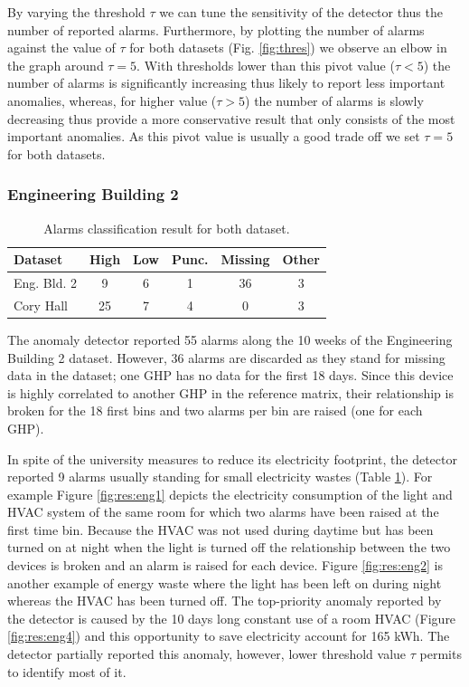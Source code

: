 By varying the threshold $\tau$ we can tune the sensitivity of the detector thus the number of reported alarms.  
Furthermore, by plotting the number of alarms against the value of $\tau$ for both datasets (Fig. \ref{fig:thres}) we observe an elbow in the graph around $\tau=5$.
With thresholds lower than this pivot value ($\tau<5$) the number of alarms is significantly increasing thus likely to report less important anomalies, whereas, for higher value ($\tau>5$) the number of alarms is slowly decreasing thus provide a more conservative result that only consists of the most important anomalies.
As this pivot value is usually a good trade off we set $\tau=5$ for both datasets.


\subsubsection{Engineering Building 2}

\begin{table}
\begin{center}
\begin{tabular}{|l||c|c|c|c|c|}
\hline
Dataset&High&Low&Punc.&Missing&Other\\ \hline \hline
Eng. Bld. 2& 9 & 6 & 1 & 36 & 3 \\ \hline
Cory Hall& 25 & 7 & 4 & 0 & 3 \\ \hline
\end{tabular}
\end{center}
\caption{Alarms classification result for both dataset.}
\label{tab:classif}
\end{table}

The anomaly detector reported 55 alarms along the 10 weeks of the Engineering Building 2 dataset.
However, 36 alarms are discarded as they stand for missing data in the dataset; one GHP has no data for the first 18 days.
Since this device is highly correlated to another GHP in the reference matrix, their relationship is broken for the 18 first bins and two alarms per bin are raised (one for each GHP).

In spite of the university measures to reduce its electricity footprint, the detector reported 9 alarms usually standing for small electricity wastes (Table \ref{tab:classif}).
For example Figure \ref{fig:res:eng1} depicts the electricity consumption of the light and HVAC system of the same room for which two alarms have been raised at the first time bin.
Because the HVAC was not used during daytime but has been turned on at night when the light is turned off the relationship between the two devices is broken and an alarm is raised for each device.
Figure \ref{fig:res:eng2} is another example of energy waste where the light has been left on during night whereas the HVAC has been turned off.
The top-priority anomaly reported by the detector is caused by the 10 days long constant use of a room HVAC (Figure \ref{fig:res:eng4}) and this opportunity to save electricity account for 165 kWh.
The detector partially reported this anomaly, however, lower threshold value $\tau$ permits to identify most of it.

